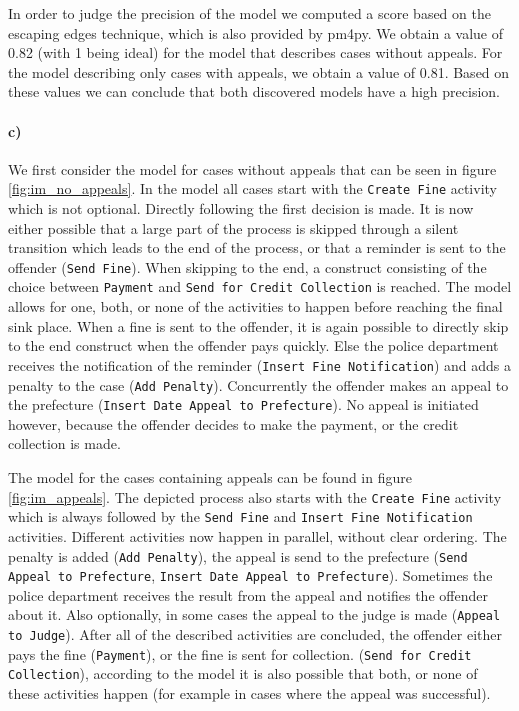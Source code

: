 \documentclass[12pt]{report}
\begin{document}
In order to judge the precision of the model we computed a score based on the escaping edges technique, which is also provided by pm4py. We obtain a value of 0.82 (with 1 being ideal) for the model that describes cases without appeals. For the model describing only cases with appeals, we obtain a value of 0.81. Based on these values we can conclude that both discovered models have a high precision.

\paragraph{\textbf{c)}}

We first consider the model for cases without appeals that can be seen in figure \ref{fig:im_no_appeals}. In the model all cases start with the \texttt{Create Fine} activity which is not optional. Directly following the first decision is made. It is now either possible that a large part of the process is skipped through a silent transition which leads to the end of the process, or that a reminder is sent to the offender (\texttt{Send Fine}). When skipping to the end, a construct consisting of the choice between \texttt{Payment} and \texttt{Send for Credit Collection} is reached. The model allows for one, both, or none of the activities to happen before reaching the final sink place. When a fine is sent to the offender, it is again possible to directly skip to the end construct when the offender pays quickly. Else the police department receives the notification of the reminder (\texttt{Insert Fine Notification}) and adds a penalty to the case (\texttt{Add Penalty}). Concurrently the offender makes an appeal to the prefecture (\texttt{Insert Date Appeal to Prefecture}). No appeal is initiated however, because the offender decides to make the payment, or the credit collection is made.

The model for the cases containing appeals can be found in figure \ref{fig:im_appeals}. The depicted process also starts with the \texttt{Create Fine} activity which is always followed by the \texttt{Send Fine} and \texttt{Insert Fine Notification} activities. Different activities now happen in parallel, without clear ordering. The penalty is added (\texttt{Add Penalty}), the appeal is send to the prefecture (\texttt{Send Appeal to Prefecture}, \texttt{Insert Date Appeal to Prefecture}). Sometimes the police department receives the result from the appeal and notifies the offender about it. Also optionally, in some cases the appeal to the judge is made (\texttt{Appeal to Judge}). After all of the described activities are concluded, the offender either pays the fine (\texttt{Payment}), or the fine is sent for collection. (\texttt{Send for Credit Collection}), according to the model it is also possible that both, or none of these activities happen (for example in cases where the appeal was successful).
\end{document}
